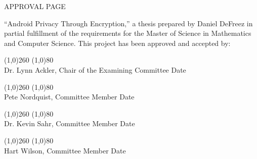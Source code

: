 \onehalfspacing

\begin{center}
APPROVAL PAGE \\[0.5in]
\end{center}

\noindent
``Android Privacy Through Encryption,'' a thesis prepared by Daniel DeFreez in partial fulfillment of the requirements for the
Master of Science in Mathematics and Computer Science. This project has been approved and accepted by:

\vspace{0.5in}

\singlespacing

\noindent
\line(1,0){260} \hspace{0.5in} \line(1,0){80} \\
\noindent
Dr. Lynn Ackler, Chair of the Examining Committee \hspace{0.55in} Date

\vspace{1in}

\noindent
\line(1,0){260} \hspace{0.5in} \line(1,0){80} \\
\noindent
Pete Nordquist, Committee Member \hspace{1.64in} Date

\vspace{1in}

\noindent
\line(1,0){260} \hspace{0.5in} \line(1,0){80} \\
\noindent
Dr. Kevin Sahr, Committee Member \hspace{1.64in} Date

\vspace{1in}

\noindent
\line(1,0){260} \hspace{0.5in} \line(1,0){80} \\
\noindent
Hart Wilson, Committee Member \hspace{1.82in} Date

\restoregeometry
